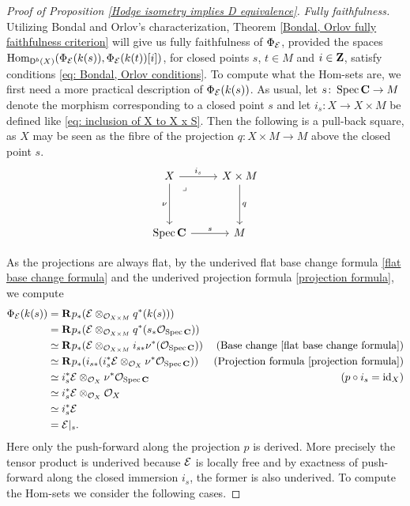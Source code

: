 \begin{proof}[Proof of Proposition \ref{Hodge isometry implies D equivalence}]
    \vspace{0.3 cm}
    \noindent
    \textsl{Fully faithfulness.} Utilizing Bondal and Orlov's characterization, Theorem \ref{Bondal, Orlov fully faithfulness criterion} will give us fully faithfulness of $\Phi_{\mathcal E}$, provided the spaces $\operatorname{Hom}_{\mathsf{D}^b(X)}(\Phi_{\mathcal E}(k(s)), \Phi_{\mathcal E}(k(t))[i])$, for closed points $s$, $t \in M$ and $i \in \mathbf Z$, satisfy conditions \eqref{eq: Bondal, Orlov conditions}. To compute what the Hom-sets are, we first need a more practical description of $\Phi_{\mathcal E}(k(s))$. As usual, let $s \colon \operatorname{Spec}\mathbf C \to M$ denote the morphism corresponding to a closed point $s$ and let $i_s \colon X \to X \times M$ be defined like \eqref{eq: inclusion of X to X x S}. Then the following is a pull-back square, as $X$ may be seen as the fibre of the projection $q \colon X \times M \to M$ above the closed point $s$.
    \[\begin{tikzcd}[column sep = small, row sep = 1.8em]
        X && X \times M \\
        \\
        \spec{\C} && M
        \arrow["{i_s}", from=1-1, to=1-3]
        \arrow["{\nu}"', from=1-1, to=3-1]
        \arrow["\lrcorner"{anchor=center, pos=0.125}, draw=none, from=1-1, to=3-3]
        \arrow["{q}", from=1-3, to=3-3]
        \arrow["{s}", from=3-1, to=3-3]
    \end{tikzcd}\]

    As the projections are always flat, by the underived flat base change formula \ref{flat base change formula} and the underived projection formula \ref{projection formula}, we compute
    \begin{align*}
        \Phi_{\mathcal E}(k(s)) 
        &= \mathbf{R}^{}p_*(\mathcal E \otimes_{{\mathcal{O}_{X \times M}}} q^*(k(s))) \\
        & = \mathbf{R}^{}p_*(\mathcal E \otimes_{{\mathcal{O}_{X \times M}}} q^*(s_*{\mathcal{O}_{\operatorname{Spec}\mathbf C}})) \\
        & \simeq \mathbf{R}^{}p_*(\mathcal E \otimes_{{\mathcal{O}_{X \times M}}} i_{s*}\nu^*({\mathcal{O}_{\operatorname{Spec}\mathbf C}})) &\text{(Base change \ref{flat base change formula})}\\
        & \simeq \mathbf{R}^{}p_*(i_{s*}(i_s^*\mathcal E \otimes_{{\mathcal{O}_{X}}} \nu^*{\mathcal{O}_{\operatorname{Spec}\mathbf C}})) &\text{(Projection formula \ref{projection formula})}\\
        & \simeq i_s^*\mathcal E \otimes_{{\mathcal{O}_{X}}} \nu^*{\mathcal{O}_{\operatorname{Spec}\mathbf C}} &\text{($p \circ i_s = \operatorname{id}_{X}$)}\\
        & \simeq i_s^*\mathcal E \otimes_{{\mathcal{O}_{X}}} {\mathcal{O}_{X}} \\
        & \simeq i_s^*\mathcal E \\
        & = \mathcal E|_s.
    \end{align*}
    Here only the push-forward along the projection $p$ is derived. More precisely the tensor product is underived because $\mathcal E$ is locally free and by exactness of push-forward along the closed immersion $i_s$, the former is also underived. To compute the Hom-sets we consider the following cases.


\end{proof}
